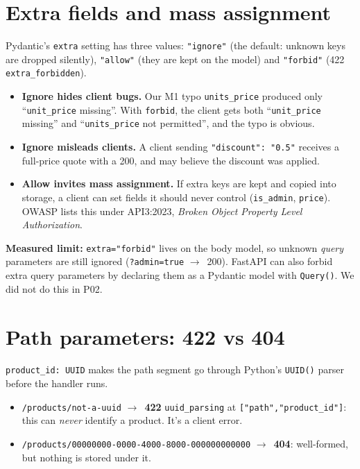\documentclass[11pt,a4paper]{article}
\newcommand{\code}[1]{\texttt{#1}}
\newcommand{\ra}{$\rightarrow$}
\begin{document}
\section{Extra fields and mass assignment}

Pydantic's \code{extra} setting has three values: \code{"ignore"} (the default: unknown
keys are dropped silently), \code{"allow"} (they are kept on the model) and
\code{"forbid"} (422 \code{extra\_forbidden}).

\begin{itemize}
  \item \textbf{Ignore hides client bugs.} Our M1 typo \code{units\_price} produced
  only ``\code{unit\_price} missing''. With \code{forbid}, the client gets both
  ``\code{unit\_price} missing'' and ``\code{units\_price} not permitted'', and the typo
  is obvious.
  \item \textbf{Ignore misleads clients.} A client sending \code{"discount": "0.5"}
  receives a full-price quote with a 200, and may believe the discount was applied.
  \item \textbf{Allow invites mass assignment.} If extra keys are kept and copied into
  storage, a client can set fields it should never control (\code{is\_admin},
  \code{price}). OWASP lists this under API3:2023, \emph{Broken Object Property Level
  Authorization}.
\end{itemize}

\textbf{Measured limit:} \code{extra="forbid"} lives on the body model, so unknown
\emph{query} parameters are still ignored (\code{?admin=true} \ra\ 200). FastAPI can
also forbid extra query parameters by declaring them as a Pydantic model with
\code{Query()}. We did not do this in P02.

\section{Path parameters: 422 vs 404}

\code{product\_id: UUID} makes the path segment go through Python's \code{UUID()}
parser before the handler runs.

\begin{itemize}
  \item \code{/products/not-a-uuid} \ra\ \textbf{422} \code{uuid\_parsing} at
  \code{["path","product\_id"]}: this can \emph{never} identify a product. It's a client error.
  \item \code{/products/00000000-0000-4000-8000-000000000000} \ra\ \textbf{404}: well-formed,
  but nothing is stored under it.
\end{itemize}
\end{document}
